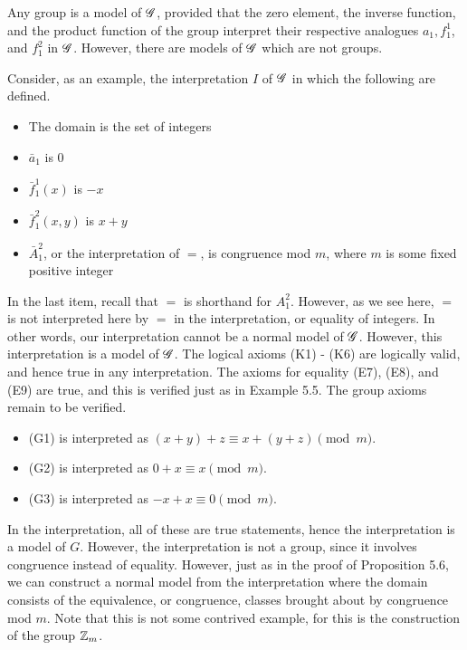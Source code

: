 Any group is a model of \(\mathscr{G}\), provided that the zero element, the inverse function, and the product function of the group interpret their respective analogues \(a_1, f^1_1\), and \(f^2_1\) in \(\mathscr{G}\). However, there are models of \(\mathscr{G}\) which are not groups.

Consider, as an example, the interpretation \(I\) of \(\mathscr{G}\) in which the following are defined.
\begin{itemize}
  \item The domain is the set of integers
  \item \(\bar{a}_1\) is 0
  \item \(\bar{f}^1_1(x)\) is \(-x\)
  \item \(\bar{f}^2_1(x, y)\) is \(x + y\)
  \item \(\bar{A}^2_1\), or the interpretation of \(=\), is congruence mod \(m\), where \(m\) is some fixed positive integer
\end{itemize}
In the last item, recall that \(=\) is shorthand for \(A^2_1\). However, as we see here, \(=\) is not interpreted here by \(=\) in the interpretation, or equality of integers. In other words, our interpretation cannot be a normal model of \(\mathscr{G}\). However, this interpretation is a model of \(\mathscr{G}\). The logical axioms (K1) - (K6) are logically valid, and hence true in any interpretation. The axioms for equality (E7), (E8), and (E9) are true, and this is verified just as in Example 5.5. The group axioms remain to be verified.
\begin{itemize}
  \item (G1) is interpreted as \((x + y) + z \equiv x + (y + z) \pmod{m}\).
  \item (G2) is interpreted as \(0 + x \equiv x \pmod{m}\).
  \item (G3) is interpreted as \(-x + x \equiv 0 \pmod{m}\).
\end{itemize}
In the interpretation, all of these are true statements, hence the interpretation is a model of \(G\). However, the interpretation is not a group, since it involves congruence instead of equality. However, just as in the proof of Proposition 5.6, we can construct a normal model from the interpretation where the domain consists of the equivalence, or congruence, classes brought about by congruence mod \(m\). Note that this is not some contrived example, for this is the construction of the group \(\mathbb{Z}_m\).

